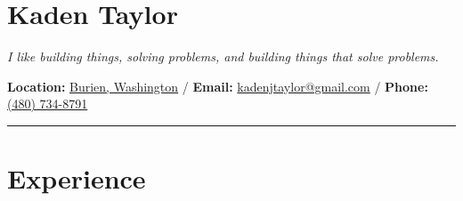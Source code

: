 \documentclass{article}
\begin{document}
\raggedright{\section*{Kaden Taylor}}
\textit{I like building things, solving problems, and building things that solve problems.}
\newline
\begin{center}
\textbf{Location:} \href{https://www.google.com/maps/search/?api=1&query=Burien+WA}{Burien, Washington} /
\textbf{Email:} \href{mailto:kadenjtaylor@gmail.com}{kadenjtaylor@gmail.com} /
\textbf{Phone:} \href{tel:4807348791}{(480) 734-8791}
\end{center}
\noindent\rule{\linewidth}{1pt}

\raggedright{\section*{Experience}}
\end{document}
